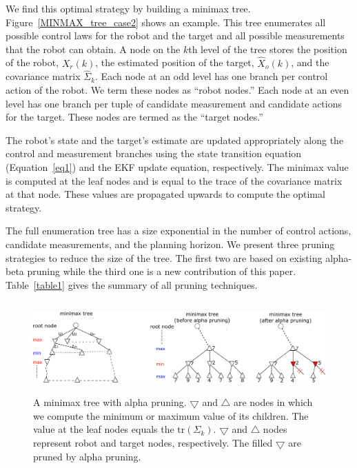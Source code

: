 \documentclass[journal]{IEEEtran}
\begin{document}
We find this optimal strategy by building a minimax tree. Figure~\ref{MINMAX_tree_case2} shows an example.  This tree enumerates all possible control laws for the robot and the target and all possible measurements that the robot can obtain. A node on the $k$th level of the tree stores the position of the robot, $X_r(k)$, the estimated position of the target, $\hat{X}_o(k)$, and the covariance matrix $\hat{\Sigma}_k$. Each node at an odd level has one branch per control action of the robot. We term these nodes as ``robot nodes.'' Each node at an even level has one branch per tuple of candidate measurement and candidate actions for the target. These nodes are termed as the ``target nodes.'' 

The robot's state and the target's estimate are updated appropriately along the control and measurement branches using the state transition equation (Equation~\ref{eq1}) and the EKF update equation, respectively. The minimax value is computed at the leaf nodes and is equal to the trace of the covariance matrix at that node. These values are propagated upwards to compute the optimal strategy. 

The full enumeration tree has a size exponential in the number of control actions, candidate measurements, and the planning horizon. We present three pruning strategies to reduce the size of the tree. The first two are based on existing alpha-beta pruning while the third one is a new contribution of this paper. Table~\ref{table1} gives the summary of all pruning techniques.

\begin{figure}[h] 
  \centering
  \includegraphics[height=3.5cm  ]{figs/MINMAX_tree.eps}
  \caption{A minimax tree with alpha pruning. $\bigtriangledown$  and $\bigtriangleup$  are nodes in which we compute the minimum or maximum value of its children. The value at the leaf nodes equals the $\mathrm{tr}(\Sigma_k) $. $\bigtriangledown$  and $\bigtriangleup$ nodes represent robot and target nodes, respectively. The filled $\bigtriangledown$ are pruned by alpha pruning.}
  \label{Minimaxtree1}
\end{figure}
\end{document}
